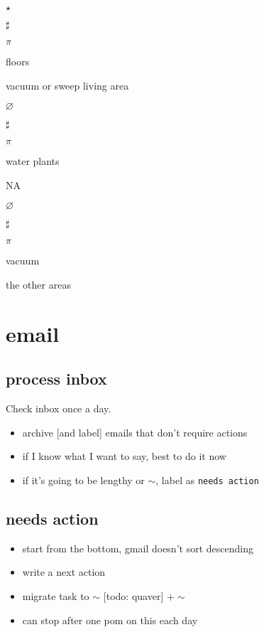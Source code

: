 \documentclass[]{book}
\providecommand{\tightlist}{%
  \setlength{\itemsep}{0pt}\setlength{\parskip}{0pt}}
\begin{document}
\(\star\)

\(\sharp\)

\(\pi\)

floors

vacuum or sweep living area

\(\varnothing\)

\(\sharp\)

\(\pi\)

water plants

NA

\(\varnothing\)

\(\sharp\)

\(\pi\)

vacuum

the other areas

\hypertarget{email}{%
\section{email}\label{email}}

\hypertarget{process-inbox}{%
\subsection{process inbox}\label{process-inbox}}

Check inbox once a day.

\begin{itemize}
\tightlist
\item
  archive {[}and label{]} emails that don't require actions
\item
  if I know what I want to say, best to do it now
\item
  if it's going to be lengthy or \(\sim\), label as \texttt{needs\ action}
\end{itemize}

\hypertarget{needs-action}{%
\subsection{needs action}\label{needs-action}}

\begin{itemize}
\tightlist
\item
  start from the bottom, gmail doesn't sort descending
\item
  write a next action
\item
  migrate task to \(\sim\) {[}todo: quaver{]} \(+ \sim\)
\item
  can stop after one pom on this each day
\end{itemize}
\end{document}
